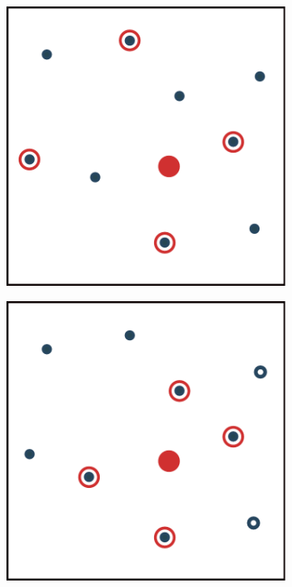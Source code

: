 \documentclass[
  a4paper,  %
  twoside,  %
  bibliography=totoc,
  headsepline,
  cleardoublepage=empty,
  parskip=half,
  draft=false
]{scrbook}
\begin{document}
\begin{mdframed}[style=style]
\vspace{2mm}
\begin{figure}[H]
  \centering
\begin{subfigure}{.45\textwidth}
  \centering
  \includegraphics[width=.8\linewidth]{graphics/as_rn}
  \vspace{2mm}
  \label{fig:as_rn}
\end{subfigure}%
\begin{subfigure}{.45\textwidth}
  \centering
  \includegraphics[width=.8\linewidth]{graphics/as_nn}

\end{subfigure}
\end{figure}
\end{mdframed}
\end{document}
